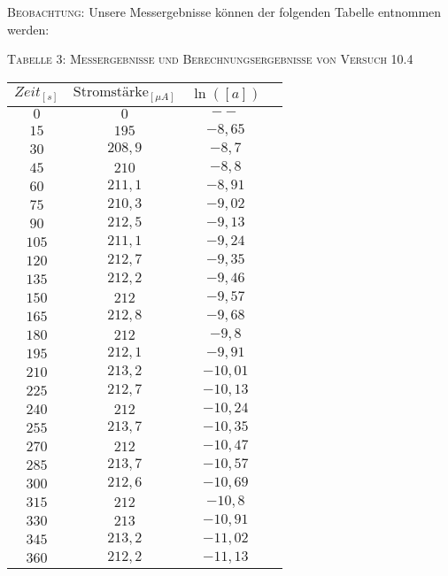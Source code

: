 \documentclass[11pt, a4paper]{article}
\begin{document}
\textsc{Beobachtung:}\hspace{5mm} Unsere Messergebnisse können der folgenden Tabelle entnommen werden:\\
\begin{center}
\textsc{Tabelle 3: Messergebnisse und Berechnungsergebnisse von Versuch 10.4}\\
\begin{tabular}{cccc}
$Zeit_{[s]}$ & $\textrm{Stromstärke}_{[\mu A]}$ & $\ln([a])$\\
\hline
$0$ & $0$ & $--$\\
$15$ & $195$ & $-8,65$\\
$30$ & $208,9$ & $-8,7$\\
$45$ & $210$ & $-8,8$\\
$60$ & $211,1$ & $-8,91$\\
$75$ & $210,3$ & $-9,02$\\
$90$ & $212,5$ & $-9,13$\\
$105$ & $211,1$ & $-9,24$\\
$120$ & $212,7$ & $-9,35$\\
$135$ & $212,2$ & $-9,46$\\
$150$ & $212$ & $-9,57$\\
$165$ & $212,8$ & $-9,68$\\
$180$ & $212$ & $-9,8$\\
$195$ & $212,1$ & $-9,91$\\
$210$ & $213,2$ & $-10,01$\\
$225$ & $212,7$ & $-10,13$\\
$240$ & $212$ & $-10,24$\\
$255$ & $213,7$ & $-10,35$\\
$270$ & $212$ & $-10,47$\\
$285$ & $213,7$ & $-10,57$\\
$300$ & $212,6$ & $-10,69$\\
$315$ & $212$ & $-10,8$\\
$330$ & $213$ & $-10,91$\\
$345$ & $213,2$ & $-11,02$\\
$360$ & $212,2$ & $-11,13$\\

\end{tabular}
\end{center}
\end{document}
